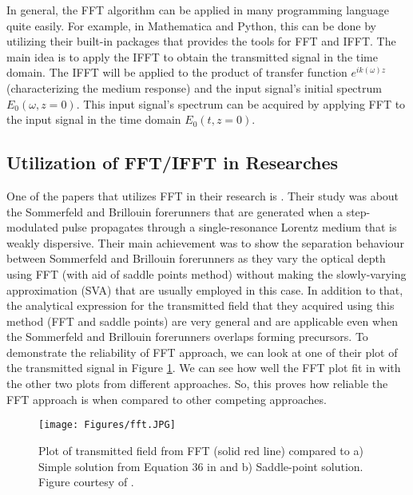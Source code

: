 In general, the FFT algorithm can be applied in many programming language quite easily. For example, in Mathematica and Python, this can be done by utilizing their built-in packages that provides the tools for FFT and IFFT. The main idea is to apply the IFFT to obtain the transmitted signal in the time domain. The IFFT will be applied to the product of transfer function $e^{i k(\omega)z}$ (characterizing the medium response) and the input signal's initial spectrum $E_{0}(\omega, z = 0)$. This input signal's spectrum can be acquired by applying FFT to the input signal in the time domain $E_{0}(t, z = 0)$.

\subsection{Utilization of FFT/IFFT in Researches}
One of the papers that utilizes FFT in their research is \cite{Macke2013}. Their study was about the Sommerfeld and Brillouin forerunners that are generated when a step-modulated pulse propagates through a single-resonance Lorentz medium that is weakly dispersive. Their main achievement was to show the separation behaviour between Sommerfeld and Brillouin forerunners as they vary the optical depth using FFT (with aid of saddle points method) without making the slowly-varying approximation (SVA) that are usually employed in this case. In addition to that, the analytical expression for the transmitted field that they acquired using this method (FFT and saddle points) are very general and are applicable even when the Sommerfeld and Brillouin forerunners overlaps forming precursors. To demonstrate the reliability of FFT approach, we can look at one of their plot of the transmitted signal in Figure \ref{fig: fft}. We can see how well the FFT plot fit in with the other two plots from different approaches. So, this proves how reliable the FFT approach is when compared to other competing approaches.

\begin{figure}
    \centering
    \texttt{[image: Figures/fft.JPG]}
    \caption{Plot of transmitted field from FFT (solid red line) compared to a) Simple solution from Equation 36 in \protect\cite{Macke2013} and b) Saddle-point solution. Figure courtesy of \protect\cite{Macke2013}.}
    \label{fig: fft}
\end{figure}

